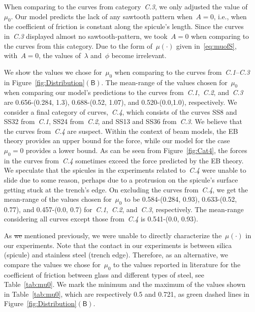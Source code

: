 \documentclass[preprint,10pt,times]{elsarticle}
\numberwithin{equation}{section}
\newcommand{\pr}[1]{\left( #1 \right)}
\newcommand{\subf}[1]{\pr{\textsf{#1}}}
\begin{document}
When comparing to the curves from category~\textit{C.3}, we only adjusted
the value of~$\mu_0$. Our model predicts the lack of any sawtooth
pattern when~$A=0$, i.e., when the coefficient of friction is constant
along the spicule's length. Since the curves in~\textit{C.3} displayed
almost no sawtooth-pattern, we took~$A=0$ when comparing to the
curves from this category. Due to the form of~$\mu(\cdot)$ given
in~\eqref{eq:muofS}, with~$A=0$, the values of~$\lambda$ and~$\phi$
become irrelevant.

We show the values we chose for~$\mu_0$ when comparing to the curves
from~\textit{C.1}--\textit{C.3} in Figure~\ref{fig:Distribution}$\subf{B}$.
The mean-range of the values chosen for~$\mu_0$ when comparing our
model's predictions to the curves from~\textit{C.1},~\textit{C.2},
and~\textit{C.3} are 0.656-(0.284, 1.3), 0.688-(0.52, 1.07), and
0.520-(0.0,1.0), respectively. We consider a final category of curves,~\textit{C.4},
which consists of the curves SS8 and SS32 from~\textit{C.1}, SS24
from~\textit{C.2}, and SS13 and SS36 from~\textit{C.3}. We believe that
the curves from~\textit{C.4} are suspect. Within the context of
beam models, the EB theory provides an upper bound for the force,
while our model for the case~$\mu_0=0$ provides a lower bound. As
can be seen from Figure~\ref{fig:Cat4}, the forces in the curves
from~\textit{C.4} sometimes exceed the force predicted by the EB
theory. We speculate that the spicules in the experiments related
to~\textit{C.4} were unable to slide due to some reason, perhaps
due to a protrusion on the spicule's surface getting stuck at the
trench's edge. On excluding the curves from~\textit{C.4}, we get the
mean-range of the values chosen for~$\mu_0$ to be 0.584-(0.284,
0.93), 0.633-(0.52, 0.77), and 0.457-(0.0, 0.7) for~\textit{C.1},~\textit{C.2},
and~\textit{C.3}, respectively. The mean-range considering all
curves except those from~\textit{C.4} is 0.541-(0.0, 0.93).

As \sout{we }mentioned previously, we were unable to directly characterize
the~$\mu(\cdot)$ in our experiments. Note that the contact in our
experiments is between silica (spicule) and stainless steel (trench
edge). Therefore, as an alternative, we compare the values we chose
for~$\mu_0$ to the values reported in literature for the coefficient
of friction between glass and different types of steel, see Table~\ref{tab:mu0}.
We mark the minimum and the maximum of the values shown in Table~\ref{tab:mu0},
which are respectively 0.5 and 0.721, as green dashed lines in Figure~\ref{fig:Distribution}$\subf{B}$.
\end{document}
